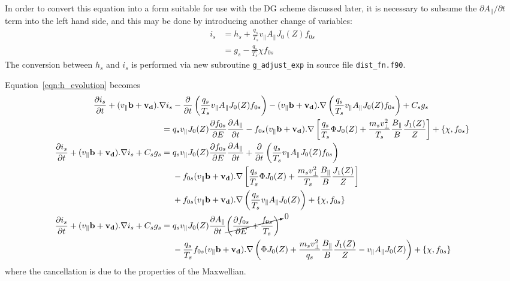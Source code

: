 \documentclass[10pt,a4paper]{article}
\newcommand{\dd}{\partial}
\begin{document}
In order to convert this equation into a form suitable for use with the DG
scheme discussed later, it is necessary to subsume the $\dd A_\parallel / \dd
t$ term into the left hand side, and this may be done by introducing another
change of variables:
\begin{align}
  i_s & = h_s + \frac{q_s}{T_s} v_\parallel A_\parallel J_0(Z) f_{0s}
  \label{eqn:h2i} \\
  & = g_s - \frac{q_s}{T_s}  \chi f_{0s}
\end{align}
The conversion between $h_s$ and $i_s$ is performed via new subroutine
\texttt{g\_adjust\_exp} in source file \texttt{dist\_fn.f90}.

Equation~\ref{eqn:h_evolution} becomes
\begin{align}
  \frac{\dd i_s}{\dd t} + (v_\parallel \mathbf{b} + \mathbf{v_d}).\nabla i_s
  & - \frac{\dd}{\dd t} \left( \frac{q_s}{T_s} v_\parallel A_\parallel J_0(Z)
    f_{0s} \right) - (v_\parallel \mathbf{b} + \mathbf{v_d}).\nabla \left(
    \frac{q_s}{T_s} v_\parallel A_\parallel J_0(Z) f_{0s} \right)
  + C_s g_s \nonumber \\
  = {}& q_s v_\parallel J_0(Z) \frac{\dd f_{0s}}{\dd E} \frac{\dd
    A_\parallel}{\dd t} 
  - f_{0s}(v_\parallel \mathbf{b} + \mathbf{v_d}).\nabla 
  \left[ \frac{q_s}{T_s} \Phi J_0(Z) +\frac{m_s v_\perp^2}{T_s}
    \frac{B_\parallel}{B} \frac{J_1(Z)}{Z} \right] + \left\{ \chi,
    f_{0s}\right\} \nonumber \\
  \frac{\dd i_s}{\dd t} + (v_\parallel \mathbf{b} + \mathbf{v_d}).\nabla i_s + C_s g_s 
  = {}& q_s v_\parallel J_0(Z) \frac{\dd f_{0s}}{\dd E} \frac{\dd
    A_\parallel}{\dd t} + \frac{\dd}{\dd t} \left( \frac{q_s}{T_s} v_\parallel
    A_\parallel J_0(Z) f_{0s} \right) \nonumber \\
  {}& - f_{0s}(v_\parallel \mathbf{b} + \mathbf{v_d}).\nabla 
  \left[ \frac{q_s}{T_s} \Phi J_0(Z) +\frac{m_s v_\perp^2}{T_s}
    \frac{B_\parallel}{B} \frac{J_1(Z)}{Z} \right] \nonumber \\
  {}& + f_{0s} (v_\parallel \mathbf{b} + \mathbf{v_d}).\nabla \left(
    \frac{q_s}{T_s} v_\parallel A_\parallel J_0(Z) \right)
  + \left\{ \chi, f_{0s}\right\} \nonumber \\
  \frac{\dd i_s}{\dd t} + (v_\parallel \mathbf{b} + \mathbf{v_d}).\nabla i_s + C_s g_s 
  = {}& q_s v_\parallel J_0(Z) \frac{\dd A_\parallel}{\dd t}
  \cancelto{0}{ \left( \frac{\dd f_{0s}}{\dd E} + \frac{f_{0s}}{T_s} \right) }
  \nonumber \\
  {}& - \frac{q_s}{T_s} f_{0s} (v_\parallel \mathbf{b} + \mathbf{v_d}).\nabla
  \left( \Phi J_0(Z) + \frac{m_s v_\perp^2}{q_s} \frac{B_\parallel}{B}
    \frac{J_1(Z)}{Z} - v_\parallel A_\parallel J_0(Z) \right) + \left\{ \chi, f_{0s}\right\}
\end{align}
where the cancellation is due to the properties of the Maxwellian.
\end{document}
